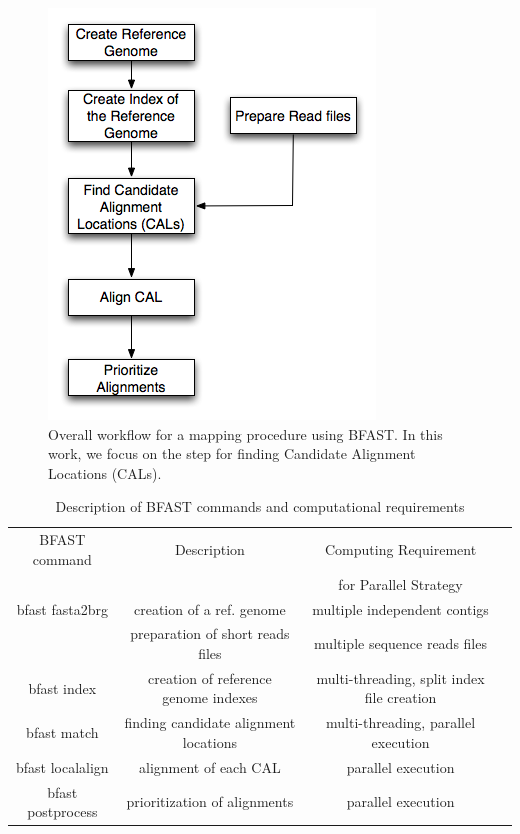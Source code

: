 \documentclass[12pt]{article}
\begin{document}
\begin{figure}
 \centering
\includegraphics[scale=0.45]{figures/workflow.png} 

\caption{\small Overall workflow for a mapping procedure using BFAST.  In this work, we focus on the step for finding Candidate Alignment Locations (CALs).  }
  \label{fig:workflow-bfast} 
 \end{figure}


\begin{table}
\begin{tabular}{|c|c|c|c|} 
  \hline 
 BFAST command & Description & Computing  Requirement  \\ 
  &  &     for Parallel Strategy \\\hline
bfast fasta2brg & creation of a ref. genome  &    multiple independent contigs \\
&  preparation of short reads files &     multiple sequence reads files \\
  bfast index & creation of reference genome indexes& multi-threading, split index file creation\\
 bfast match & finding candidate alignment locations  &  multi-threading, parallel execution \\
 bfast localalign & alignment of each CAL  &   parallel execution \\
bfast postprocess & prioritization of alignments  &  parallel execution \\ \hline


\hline
\end{tabular} \caption{Description of BFAST commands and computational requirements}
 \label{table:bfast-summary} 
\end{table}
\end{document}
